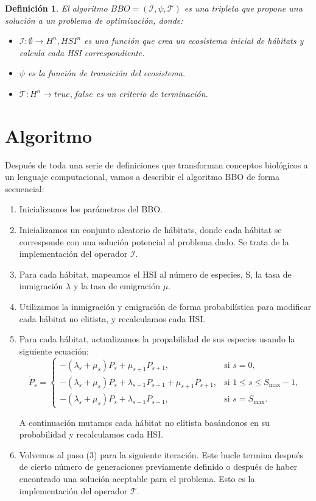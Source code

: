 \documentclass{article}
\newtheorem{mydef}{Definición}
\begin{document}
\begin{mydef}
    El algoritmo $BBO = (\mathcal{I},\psi,\mathcal{T})$ es una tripleta que propone una solución a un problema de optimización, donde:
    \begin{itemize}
        \item $\mathcal{I}: \emptyset \rightarrow {H^{n},HSI^{n}}$ es una función que crea un ecosistema inicial de hábitats y calcula cada HSI correspondiente.
        \item $\psi$ es la función de transición del ecosistema.
        \item$ \mathcal{T}: H^{n} \rightarrow {true,false}$ es un criterio de terminación.
    \end{itemize}
\end{mydef}

\section{Algoritmo}

Después de toda una serie de definiciones que transforman conceptos biológicos a un lenguaje computacional, vamos a describir el algoritmo BBO de forma secuencial:

\begin{enumerate}
    \item Inicializamos los parámetros del BBO. 
    \item Inicializamos un conjunto aleatorio de hábitats, donde cada hábitat se corresponde con una solución potencial al problema dado.
    Se trata de la implementación del operador $\mathcal{I}$.
    \item Para cada hábitat, mapeamos el HSI al número de especies, S, la tasa de inmigración $\lambda$ y la tasa de emigración $\mu$.
    \item Utilizamos la inmigración y emigración de forma probabilística para modificar cada hábitat no elitista, y recalculamos cada HSI.
    \item Para cada hábitat, actualizamos la propabilidad de sus especies usando la siguiente ecuación: 
    \[
    \dot{P}_s =
    \begin{cases}
    -(\lambda_s + \mu_s) P_s + \mu_{s+1} P_{s+1}, & \text{si } s = 0, \\[8pt]
    -(\lambda_s + \mu_s) P_s + \lambda_{s-1} P_{s-1} + \mu_{s+1} P_{s+1}, & \text{si } 1 \le s \le S_{\max}-1, \\[8pt]
    -(\lambda_s + \mu_s) P_s + \lambda_{s-1} P_{s-1}, & \text{si } s = S_{\max}.
    \end{cases}
    \]

    A continuación mutamos cada hábitat no elitista basándonos en su probabilidad y recalculamos cada HSI.

    \item Volvemos al paso (3) para la siguiente iteración. Este bucle termina después de cierto número de generaciones previamente definido o después de haber 
    encontrado una solución aceptable para el problema. Esto es la implementación del operador $\mathcal{T}$.

\end{enumerate}
\end{document}
